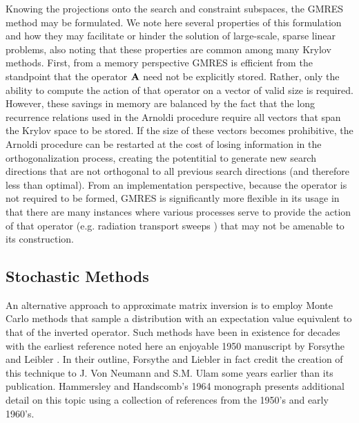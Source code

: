 Knowing the projections onto the search and constraint subspaces, the
GMRES method may be formulated. We note here several properties of
this formulation and how they may facilitate or hinder the solution of
large-scale, sparse linear problems, also noting that these properties
are common among many Krylov methods. First, from a memory perspective
GMRES is efficient from the standpoint that the operator $\mathbf{A}$ need
not be explicitly stored. Rather, only the ability to compute the
action of that operator on a vector of valid size is
required. However, these savings in memory are balanced by the fact
that the long recurrence relations used in the Arnoldi procedure
require all vectors that span the Krylov space to be stored. If the
size of these vectors becomes prohibitive, the Arnoldi procedure can
be restarted at the cost of losing information in the
orthogonalization process, creating the potentitial to generate new
search directions that are not orthogonal to all previous search
directions (and therefore less than optimal). From an implementation
perspective, because the operator is not required to be formed, GMRES
is significantly more flexible in its usage in that there are many
instances where various processes serve to provide the action of that
operator (e.g. radiation transport sweeps \citep{evans_2010}) that may
not be amenable to its construction.

\subsection{Stochastic Methods}
\label{subsec:stochastic_methods}
An alternative approach to approximate matrix inversion is to employ
Monte Carlo methods that sample a distribution with an expectation
value equivalent to that of the inverted operator. Such methods have
been in existence for decades with the earliest reference noted here
an enjoyable 1950 manuscript by Forsythe and Leibler
\citep{forsythe_1950}. In their outline, Forsythe and Liebler in fact
credit the creation of this technique to J. Von Neumann and S.M. Ulam
some years earlier than its publication. Hammersley and Handscomb's
1964 monograph \citep{hammersley_1964} presents additional detail on
this topic using a collection of references from the 1950's and early
1960's.

